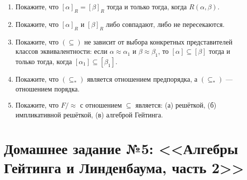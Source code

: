 \documentclass[10pt,a4paper,oneside]{article}
\begin{document}
\begin{enumerate}
\item Покажите, что $[\alpha]_R=[\beta]_R$ тогда и только тогда, когда $R(\alpha,\beta)$.
\item Покажите, что $[\alpha]_R$ и $[\beta]_R$ либо совпадают, либо не пересекаются.
\item Покажите, что $(\subseteq)$ не зависит от выбора конкретных представителей классов 
эквивалентности: если $\alpha\approx\alpha_1$ и $\beta\approx\beta_1$, то $[\alpha]\subseteq[\beta]$
тогда и только тогда, когда $[\alpha_1]\subseteq[\beta_1]$.
\item Покажите, что $(\subseteq_*)$ является отношением предпорядка, а $(\subseteq_*)$ --- отношением
порядка.
\item Покажите, что $F/\approx$ с отношением $\subseteq$ является: (а) решёткой, (б) импликативной
решёткой, (в) алгеброй Гейтинга.
\end{enumerate}

\section*{Домашнее задание №5: <<Алгебры Гейтинга и Линденбаума, часть 2>>}
\end{document}
